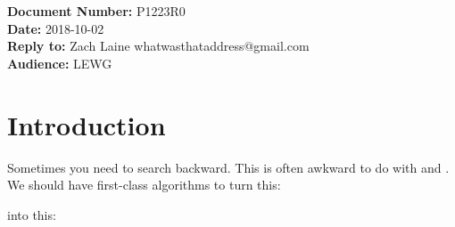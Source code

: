 \documentclass{article}
\begin{document}
\title{\textbf{\Large {}}}
\date{}
{\let\newpage\relax\maketitle}

\noindent\textbf{Document Number:} P1223R0\\
\textbf{Date:} 2018-10-02\\
\textbf{Reply to:} Zach Laine whatwasthataddress@gmail.com\\
\textbf{Audience:} LEWG

\section{Introduction}

\label{sec:intro}

Sometimes you need to search backward.  This is often awkward to do with
 and .  We should have first-class
algorithms to turn this:



into this:





\end{document}
